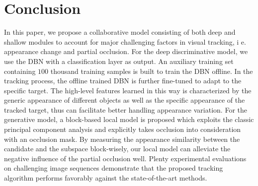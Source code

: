 \documentclass[preprint,12pt,review]{elsarticle}
\begin{document}
\section{Conclusion}
In this paper, we propose a collaborative model consisting of both deep and shallow modules to account for major challenging factors in visual tracking, i e. appearance change and partial occlusion.
%
For the deep discriminative model, we use the DBN with a classification layer as output.
%
An auxiliary training set containing $100$ thousand training samples is built to train the DBN offline.
%
In the tracking process, the offline trained DBN is further fine-tuned to adapt to the specific target.
%
The high-level features learned in this way is characterized by the generic appearance of different objects as well as the specific appearance of the tracked target, thus can facilitate better handling appearance variation.
%
%
%
For the generative model, a block-based local model is proposed which exploits the classic principal component analysis and explicitly takes occlusion into consideration with an occlusion mask.
%
By measuring the appearance similarity between the candidate and the subspace block-wisely, our local model can alleviate the negative influence of the partial occlusion well.
%
Plenty experimental evaluations on challenging image sequences demonstrate that the proposed tracking algorithm performs favorably against the state-of-the-art methods.


\end{document}
